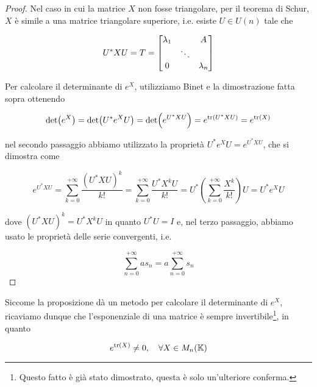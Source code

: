 \begin{proof}
	Nel caso in cui la matrice $ X $ non fosse triangolare, per il teorema di Schur, $ X $ è simile a una matrice triangolare superiore, i.e. esiste $ U \in U(n) $ tale che
	
	\begin{equation}
		U^{*} X U = T = %
		\bmqty{ %
				\lambda_{1} & & A \\
				& \ddots & \\
				0 & & \lambda_{n} %
				}
	\end{equation}
	
	Per calcolare il determinante di $ e^{X} $, utilizziamo Binet e la dimostrazione fatta sopra ottenendo
	
	\begin{equation}
		\det(e^{X}) %
		= \det(U^{*} e^{X} U) %
		= \det(e^{U^{*} X U}) %
		= e^{\tr(U^{*} X U)} %
		= e^{\tr(X)}
	\end{equation}
	
	nel secondo passaggio abbiamo utilizzato la proprietà $ U^{*} e^{X} U = e^{U^{*} X U} $, che si dimostra come
	
	\begin{equation}
		e^{U^{*} X U} %
		= \sum_{k=0}^{+\infty} \dfrac{(U^{*} X U)^{k}}{k!} %
		= \sum_{k=0}^{+\infty} \dfrac{U^{*} X^{k} U}{k!} %
		= U^{*} \left( \sum_{k=0}^{+\infty} \dfrac{X^{k}}{k!} \right) U %
		= U^{*} e^{X} U
	\end{equation}

	dove $ (U^{*} X U)^{k} = U^{*} X^{k} U $ in quanto $ U^{*} U = I $ e, nel terzo passaggio, abbiamo usato le proprietà delle serie convergenti, i.e.
	
	\begin{equation}
		\sum_{n=0}^{+\infty} a s_{n} = a \sum_{n=0}^{+\infty} s_{n}
	\end{equation}
\end{proof}

\begin{corollary}
	Siccome la proposizione dà un metodo per calcolare il determinante di $ e^{X} $, ricaviamo dunque che l'esponenziale di una matrice è sempre invertibile\footnote{%
		Questo fatto è già stato dimostrato, questa è solo un'ulteriore conferma.%
	}, in quanto

	\begin{equation}
		e^{\tr(X)} \neq 0 \qcomma \forall X \in M_{n}(\K)
	\end{equation}
\end{corollary}

